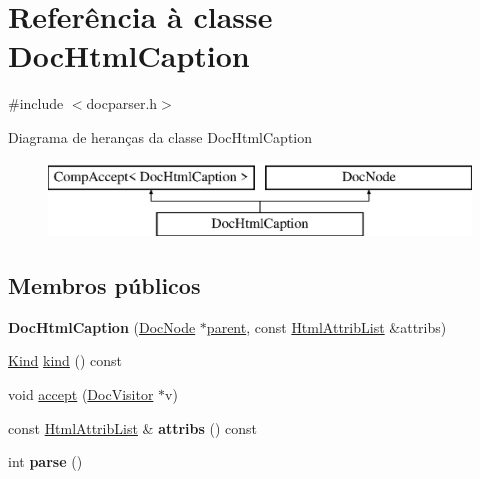 \hypertarget{class_doc_html_caption}{\section{Referência à classe Doc\-Html\-Caption}
\label{class_doc_html_caption}
}


{\ttfamily \#include $<$docparser.\-h$>$}

Diagrama de heranças da classe Doc\-Html\-Caption\begin{figure}[H]
\begin{center}
\leavevmode
\includegraphics[height=2.000000cm]{class_doc_html_caption}
\end{center}
\end{figure}
\subsection*{Membros públicos}
\begin{DoxyCompactItemize}
\item 
\hypertarget{class_doc_html_caption_ae3c9a3a6817e0dc31f524763a52db77c}{{\bfseries Doc\-Html\-Caption} (\hyperlink{class_doc_node}{Doc\-Node} $\ast$\hyperlink{class_doc_node_abd7f070d6b0a38b4da71c2806578d19d}{parent}, const \hyperlink{class_html_attrib_list}{Html\-Attrib\-List} \&attribs)}\label{class_doc_html_caption_ae3c9a3a6817e0dc31f524763a52db77c}

\item 
\hyperlink{class_doc_node_aa10c9e8951b8ccf714a59ec321bdac5b}{Kind} \hyperlink{class_doc_html_caption_aa9d037bed9f9a083d0cd01485637d843}{kind} () const 
\item 
void \hyperlink{class_doc_html_caption_a7ba716e854ae2f8f87a4eb2140e302b6}{accept} (\hyperlink{class_doc_visitor}{Doc\-Visitor} $\ast$v)
\item 
\hypertarget{class_doc_html_caption_aae3c838ea3d3273b35d07e9965a8985e}{const \hyperlink{class_html_attrib_list}{Html\-Attrib\-List} \& {\bfseries attribs} () const }\label{class_doc_html_caption_aae3c838ea3d3273b35d07e9965a8985e}

\item 
\hypertarget{class_doc_html_caption_a67007fc2be130666fbf3b065022756f4}{int {\bfseries parse} ()}\label{class_doc_html_caption_a67007fc2be130666fbf3b065022756f4}

\end{DoxyCompactItemize}

